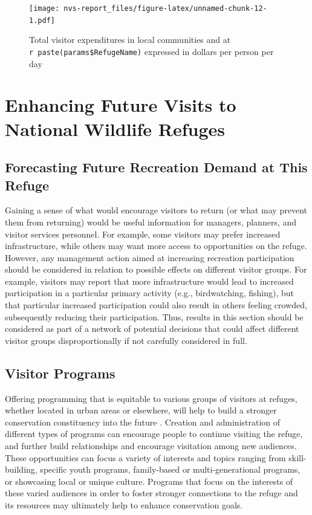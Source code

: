 \documentclass[]{book}
\let\BeginKnitrBlock\begin \let\EndKnitrBlock\end
\begin{document}
\begin{figure}
\centering
\texttt{[image: nvs-report\_files/figure-latex/unnamed-chunk-12-1.pdf]}
\caption{\label{fig:unnamed-chunk-12}Total visitor expenditures in local
communities and at \texttt{r\ paste(params\$RefugeName)} expressed in
dollars per person per day}
\end{figure}

\chapter{Enhancing Future Visits to National Wildlife
Refuges}\label{futvis}

\section*{Forecasting Future Recreation Demand at This
Refuge}\label{forecasting-future-recreation-demand-at-this-refuge}

\BeginKnitrBlock{heading4}
Gaining a sense of what would encourage visitors to return (or what may
prevent them from returning) would be useful information for managers,
planners, and visitor services personnel. For example, some visitors may
prefer increased infrastructure, while others may want more access to
opportunities on the refuge. However, any management action aimed at
increasing recreation participation should be considered in relation to
possible effects on different visitor groups. For example, visitors may
report that more infrastructure would lead to increased participation in
a particular primary activity (e.g., birdwatching, fishing), but that
particular increased participation could also result in others feeling
crowded, subsequently reducing their participation. Thus, results in
this section should be considered as part of a network of potential
decisions that could affect different visitor groups disproportionally
if not carefully considered in full.
\EndKnitrBlock{heading4}

\section*{Visitor Programs}\label{visitor-programs}

\BeginKnitrBlock{heading4}
Offering programming that is equitable to various groups of visitors at
refuges, whether located in urban areas or elsewhere, will help to build
a stronger conservation constituency into the future \citep{USFWS2014}.
Creation and administration of different types of programs can encourage
people to continue visiting the refuge, and further build relationships
and encourage visitation among new audiences. These opportunities can
focus a variety of interests and topics ranging from skill-building,
specific youth programs, family-based or multi-generational programs, or
showcasing local or unique culture. Programs that focus on the interests
of these varied audiences in order to foster stronger connections to the
refuge and its resources may ultimately help to enhance conservation
goals.
\EndKnitrBlock{heading4}
\end{document}
